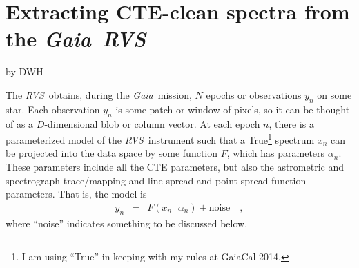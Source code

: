 \documentclass[11pt]{article}
\newcommand{\given}{\,|\,}
\newcommand{\instrument}[1]{\textsl{#1}}
\newcommand{\Gaia}{\instrument{Gaia}}
\newcommand{\RVS}{\instrument{RVS}}
\begin{document}
\section*{Extracting CTE-clean spectra from the \Gaia\ \RVS}
\noindent
by DWH

\begin{abstract}

The \Gaia~\RVS\ data will suffer from observable distortions (CTE)
caused by radiation damage and the charge traps that are caused
thereby.
The \RVS\ team is creating empirical models of the time-dependent
distortions.
These models are computationally feasible to ``run forward''; indeed
parameter estimation (radial velocities, temperatures, and so on)
based on the \RVS\ will be based on a forward model of the data,
including the CTE.
Here we show that it is possible to extract CTE-undistorted spectra
from either single epochs or else multiple epochs of \RVS\ data using
one of these CTE models.
There is no need to ``undistort'' or ``correct'' the data.
Inasmuch as these extracted spectra and their uncertainty tensors will
be close to sufficient statistics for the raw data, they could be used
for stellar parameter estimation.
\end{abstract}

The \RVS\ obtains, during the \Gaia\ mission, $N$ epochs or
observations $y_n$ on some star.
Each observation $y_n$ is some patch or window of pixels, so it can be
thought of as a $D$-dimensional blob or column vector.
At each epoch $n$, there is a parameterized model of the
\RVS\ instrument such that a True\footnote{I am using ``True'' in
  keeping with my rules at GaiaCal 2014.} spectrum $x_n$ can be
projected into the data space by some function $F$, which has
parameters $\alpha_n$.
These parameters include all the CTE parameters, but also the
astrometric and spectrograph trace/mapping and line-spread and
point-spread function parameters.
That is, the model is
\begin{eqnarray}
y_n &=& F(x_n\given \alpha_n) + \mbox{noise}
\quad,
\end{eqnarray}
where ``noise'' indicates something to be discussed below.
\end{document}
